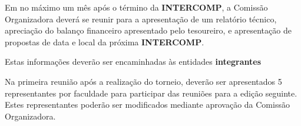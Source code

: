 \begin{article}
	Em no máximo um mês após o término da \textbf{INTERCOMP}, a Comissão Organizadora deverá se reunir para a apresentação de um relatório técnico, apreciação do balanço financeiro apresentado pelo tesoureiro, e apresentação de propostas de data e local da próxima \textbf{INTERCOMP}.

	\begin{xparagraph}
		Estas informações deverão ser encaminhadas às entidades \textbf{integrantes}
	\end{xparagraph}

	\begin{xparagraph}
		Na primeira reunião após a realização do torneio, deverão ser apresentados 5 representantes por faculdade para participar das reuniões para a edição seguinte. Estes representantes poderão ser modificados mediante aprovação da Comissão Organizadora.
	\end{xparagraph}
\end{article}
